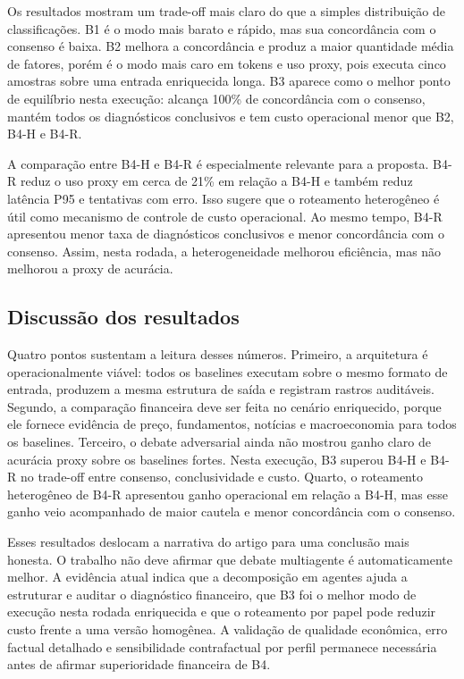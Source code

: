 Os resultados mostram um trade-off mais claro do que a simples
distribuição de classificações. B1 é o modo mais barato e rápido, mas sua
concordância com o consenso é baixa. B2 melhora a concordância e produz a
maior quantidade média de fatores, porém é o modo mais caro em tokens e
uso proxy, pois executa cinco amostras sobre uma entrada enriquecida
longa. B3 aparece como o melhor ponto de equilíbrio nesta execução:
alcança 100\% de concordância com o consenso, mantém todos os diagnósticos
conclusivos e tem custo operacional menor que B2, B4-H e B4-R.

A comparação entre B4-H e B4-R é especialmente relevante para a proposta.
B4-R reduz o uso proxy em cerca de 21\% em relação a B4-H e também reduz
latência P95 e tentativas com erro. Isso sugere que o roteamento
heterogêneo é útil como mecanismo de controle de custo operacional. Ao
mesmo tempo, B4-R apresentou menor taxa de diagnósticos conclusivos e
menor concordância com o consenso. Assim, nesta rodada, a heterogeneidade
melhorou eficiência, mas não melhorou a proxy de acurácia.

\subsection{Discussão dos resultados}

Quatro pontos sustentam a leitura desses números. Primeiro, a arquitetura
é operacionalmente viável: todos os baselines executam sobre o mesmo
formato de entrada, produzem a mesma estrutura de saída e registram rastros
auditáveis. Segundo, a comparação financeira deve ser feita no cenário
enriquecido, porque ele fornece evidência de preço, fundamentos, notícias e
macroeconomia para todos os baselines. Terceiro, o debate adversarial ainda
não mostrou ganho claro de acurácia proxy sobre os baselines fortes. Nesta
execução, B3 superou B4-H e B4-R no trade-off entre consenso,
conclusividade e custo. Quarto, o roteamento heterogêneo de B4-R apresentou
ganho operacional em
relação a B4-H, mas esse ganho veio acompanhado de maior cautela e menor
concordância com o consenso.

Esses resultados deslocam a narrativa do artigo para uma conclusão mais
honesta. O trabalho não deve afirmar que debate multiagente é
automaticamente melhor. A evidência atual indica que a decomposição em
agentes ajuda a estruturar e auditar o diagnóstico financeiro, que B3 foi o
melhor modo de execução nesta rodada enriquecida e que o roteamento por
papel pode reduzir custo frente a uma versão homogênea. A validação de qualidade
econômica, erro factual detalhado e sensibilidade contrafactual por perfil
permanece necessária antes de afirmar superioridade financeira de B4.
